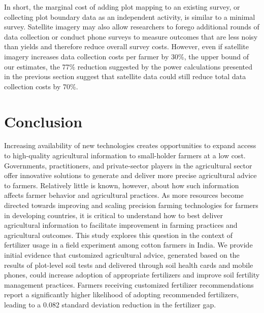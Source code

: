 \documentclass{article}
\begin{document}
In short, the marginal cost of adding plot mapping to an existing survey, or collecting plot boundary data as an independent activity, is similar to a minimal survey. Satellite imagery may also allow researchers to forego additional rounds of data collection or conduct phone surveys to measure outcomes that are less noisy than yields and therefore reduce overall survey costs. However, even if satellite imagery increases data collection costs per farmer by 30\%, the upper bound of our estimates, the 77\% reduction suggested by the power calculations presented in the previous section suggest that satellite data could still reduce total data collection costs by 70\%.

\section{Conclusion}

Increasing availability of new technologies creates opportunities to expand access to high-quality agricultural information to small-holder farmers at a low cost. Governments, practitioners, and private-sector players in the agricultural sector offer innovative solutions to generate and deliver more precise agricultural advice to farmers. Relatively little is known, however, about how such information affects farmer behavior and agricultural practices. As more resources become directed towards improving and scaling precision farming technologies for farmers in developing countries, it is critical to understand how to best deliver agricultural information to facilitate improvement in farming practices and agricultural outcomes. This study explores this question in the context of fertilizer usage in a field experiment among cotton farmers in India. We provide initial evidence that customized agricultural advice, generated based on the results of plot-level soil tests and delivered through soil health cards and mobile phones, could increase adoption of appropriate fertilizers and improve soil fertility management practices. Farmers receiving customized fertilizer recommendations report a significantly higher likelihood of adopting recommended fertilizers, leading to a 0.082 standard deviation reduction in the fertilizer gap. 
\end{document}
